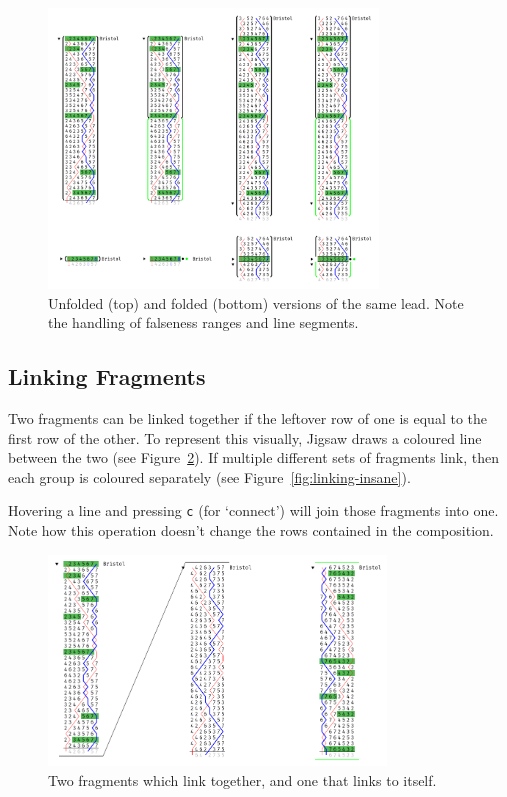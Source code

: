 \documentclass[12pt]{article}
\begin{document}
\begin{figure}
    \centering
    \includegraphics[width=0.78\textwidth]{folding-full}
    \caption{Unfolded (top) and folded (bottom) versions of the same lead.  Note the handling of
    falseness ranges and line segments.}\label{fig:lead-folding}
\end{figure}

\subsection{Linking Fragments}

Two fragments can be linked together if the leftover row of one is equal to the first row of the
other.  To represent this visually, Jigsaw draws a coloured line between the two (see
Figure~\ref{fig:linking}).  If multiple different sets of fragments link, then each group is
coloured separately (see Figure~\ref{fig:linking-insane}).

Hovering a line and pressing \verb|c| (for `connect') will join those fragments into one.  Note how
this operation doesn't change the rows contained in the composition.

\begin{figure}
    \centering
    \includegraphics[width=0.8\textwidth]{linking-2}
    \caption{Two fragments which link together, and one that links to itself.}\label{fig:linking}
\end{figure}
\end{document}
